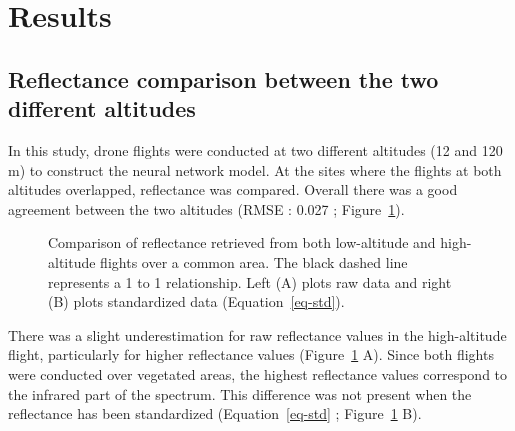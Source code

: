 \documentclass[
  number]{elsarticle}
\begin{document}
\section{Results}\label{results}

\subsection{Reflectance comparison between the two different
altitudes}\label{reflectance-comparison-between-the-two-different-altitudes}

In this study, drone flights were conducted at two different altitudes
(12 and 120 m) to construct the neural network model. At the sites where
the flights at both altitudes overlapped, reflectance was compared.
Overall there was a good agreement between the two altitudes (RMSE :
0.027 ; Figure~\ref{fig-CompareRef}).

\label{cell-fig-CompareRef}
\begin{figure}[H]


\caption{\label{fig-CompareRef}Comparison of reflectance retrieved from
both low-altitude and high-altitude flights over a common area. The
black dashed line represents a 1 to 1 relationship. Left (A) plots raw
data and right (B) plots standardized data (Equation~\ref{eq-std}).}

\end{figure}%

There was a slight underestimation for raw reflectance values in the
high-altitude flight, particularly for higher reflectance values
(Figure~\ref{fig-CompareRef} A). Since both flights were conducted over
vegetated areas, the highest reflectance values correspond to the
infrared part of the spectrum. This difference was not present when the
reflectance has been standardized (Equation~\ref{eq-std} ;
Figure~\ref{fig-CompareRef} B).
\end{document}
